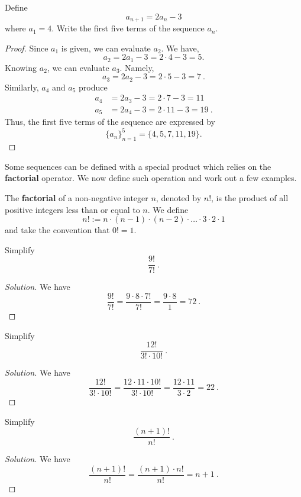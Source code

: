 \documentclass[compacto,10pt,comentarios]{aleph-notas}
\begin{document}
\begin{ejer}
    Define 
    $$
        a_{n+1} = 2a_{n} - 3
    $$
    where $a_1 = 4$. Write the first five terms of the sequence $a_n$.
\end{ejer}
\begin{proof}
    Since $a_1$ is given, we can evaluate $a_2$. We have,
    $$
        a_2 = 2a_{1} - 3 = 2 \cdot 4 - 3 = 5.
    $$
    Knowing $a_2$, we can evaluate $a_3$. Namely,
    $$
        a_3 = 2a_2 - 3 = 2 \cdot 5 - 3 = 7 ~ .
    $$
    Similarly, $a_4$ and $a_5$ produce
    \begin{align*}
        a_4 & = 2a_3 - 3 = 2 \cdot 7 - 3 = 11 \\
        a_5 & = 2a_4 - 3 = 2 \cdot 11 - 3 = 19 ~ .
    \end{align*}
    Thus, the first five terms of the sequence are expressed by
    $$
        \{a_n\}_{n=1}^{5} = \{4, 5, 7, 11, 19\}.
    $$
\end{proof}

Some sequences can be defined with a special product which relies on the \textbf{factorial} operator. We now define such operation and work out a few examples.
\begin{defi}[Factorial]
    The \textbf{factorial} of a non-negative integer $n$, denoted by $n!$, is the product of all positive integers less than or equal to $n$.
    We define
    $$
        n! := n \cdot (n-1) \cdot (n-2) \cdot \ldots \cdot 3 \cdot 2 \cdot 1
    $$
    and take the convention that $0! = 1$.
\end{defi}

\begin{ejer}
    Simplify
    $$
        \frac{9!}{7!} ~ .
    $$
\end{ejer}
\begin{proof}[Solution]
    We have
    $$
        \frac{9!}{7!} = \frac{9 \cdot 8 \cdot 7!}{7!}  = \frac{9 \cdot 8}{1} = 72 ~ .
    $$
\end{proof}

\begin{ejer}
    Simplify
    $$
        \frac{12!}{3! \cdot 10!} ~ .
    $$
\end{ejer}
\begin{proof}[Solution]
    We have
    $$
        \frac{12!}{3! \cdot 10!} = \frac{12 \cdot 11 \cdot 10!}{3! \cdot 10!} = \frac{12 \cdot 11}{3 \cdot 2} = 22 ~ .
    $$
\end{proof}

\begin{ejer}
    Simplify
    $$
        \frac{(n + 1)!}{n!} ~ .
    $$
\end{ejer}
\begin{proof}[Solution]
    We have
    $$
        \frac{(n + 1)!}{n!} = \frac{(n+1) \cdot n!}{n!} = n+1~.
    $$
\end{proof}
\end{document}
